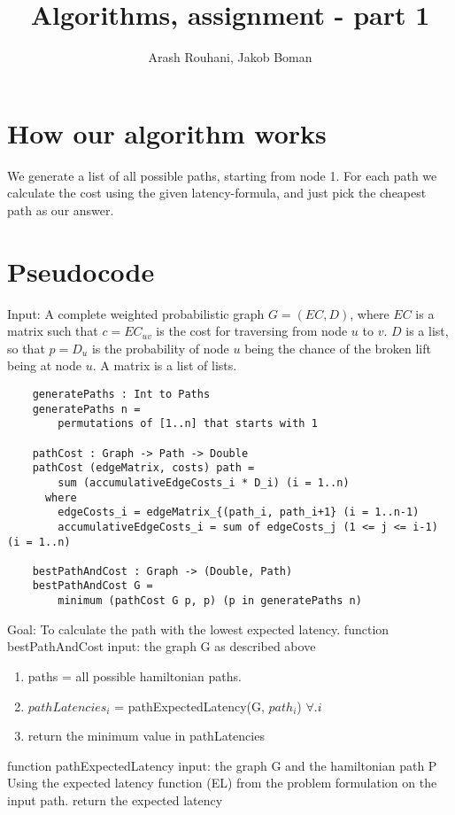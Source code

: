 \documentclass[a4paper,11pt]{article}
\title{Algorithms, assignment - part 1}
\author{Arash Rouhani, Jakob Boman}
\begin{document}
\maketitle

\section{How our algorithm works}
We generate a list of all possible paths, starting from node 1. For each path we calculate the cost using the given latency-formula, and just pick the cheapest path as our answer.

\section{Pseudocode}
Input: A complete weighted probabilistic graph $G = (EC, D)$, where $EC$ is a
matrix such that $c = EC_{uv}$ is the cost for traversing from node $u$ to $v$.
$D$ is a list, so that $p = D_u$ is the probability of node $u$ being
the chance of the broken lift being at node $u$.
A matrix is a list of lists.

\begin{lstlisting}
    generatePaths : Int to Paths
    generatePaths n =
        permutations of [1..n] that starts with 1

    pathCost : Graph -> Path -> Double
    pathCost (edgeMatrix, costs) path = 
        sum (accumulativeEdgeCosts_i * D_i) (i = 1..n)
      where
        edgeCosts_i = edgeMatrix_{(path_i, path_i+1} (i = 1..n-1)
        accumulativeEdgeCosts_i = sum of edgeCosts_j (1 <= j <= i-1) (i = 1..n) 
    
    bestPathAndCost : Graph -> (Double, Path)
    bestPathAndCost G = 
        minimum (pathCost G p, p) (p in generatePaths n)

\end{lstlisting}

Goal: To calculate the path with the lowest expected latency.
function bestPathAndCost
input: the graph G as described above
\begin{enumerate}
    \item paths = all possible hamiltonian paths.
    \item $pathLatencies_i$ = pathExpectedLatency(G, $path_i$) $\forall. i$
    \item return the minimum value in pathLatencies
\end{enumerate}
function pathExpectedLatency
input: the graph G and the hamiltonian path P
    Using the expected latency function (EL) from the problem formulation on the input path.
    return the expected latency
\end{document}
